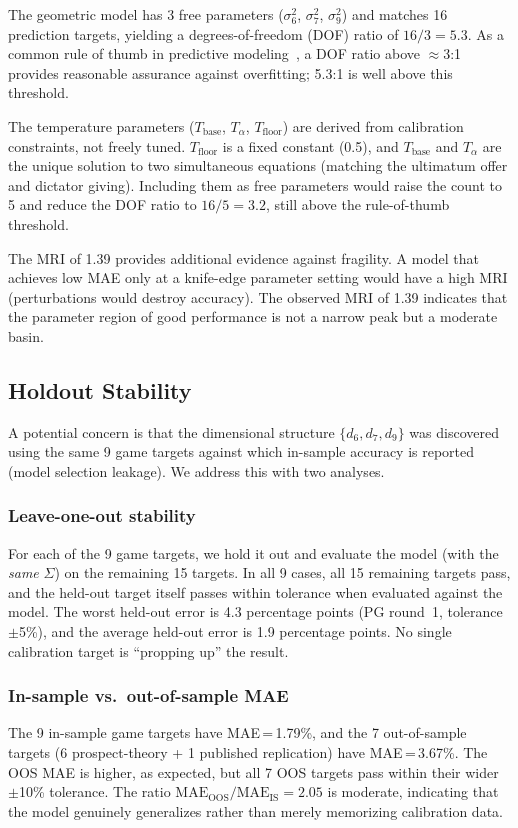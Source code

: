 \documentclass[journal]{IEEEtran}
\begin{document}
The geometric model has 3 free parameters ($\sigma_6^2$, $\sigma_7^2$, $\sigma_9^2$) and matches 16 prediction targets, yielding a degrees-of-freedom (DOF) ratio of $16/3 = 5.3$.
As a common rule of thumb in predictive modeling~\cite{hastie2009}, a DOF ratio above $\approx$3:1 provides reasonable assurance against overfitting; 5.3:1 is well above this threshold.

The temperature parameters ($T_{\text{base}}$, $T_\alpha$, $T_{\text{floor}}$) are derived from calibration constraints, not freely tuned.
$T_{\text{floor}}$ is a fixed constant (0.5), and $T_{\text{base}}$ and $T_\alpha$ are the unique solution to two simultaneous equations (matching the ultimatum offer and dictator giving).
Including them as free parameters would raise the count to 5 and reduce the DOF ratio to $16/5 = 3.2$, still above the rule-of-thumb threshold.

The MRI of 1.39 provides additional evidence against fragility.
A model that achieves low MAE only at a knife-edge parameter setting would have a high MRI (perturbations would destroy accuracy).
The observed MRI of 1.39 indicates that the parameter region of good performance is not a narrow peak but a moderate basin.

\subsection{Holdout Stability}

A potential concern is that the dimensional structure $\{d_6, d_7, d_9\}$ was discovered using the same 9 game targets against which in-sample accuracy is reported (model selection leakage).
We address this with two analyses.

\subsubsection{Leave-one-out stability}
For each of the 9 game targets, we hold it out and evaluate the model (with the \emph{same} $\Sigma$) on the remaining 15 targets.
In all 9 cases, all 15 remaining targets pass, and the held-out target itself passes within tolerance when evaluated against the model.
The worst held-out error is 4.3 percentage points (PG round~1, tolerance $\pm$5\%), and the average held-out error is 1.9 percentage points.
No single calibration target is ``propping up'' the result.

\subsubsection{In-sample vs.\ out-of-sample MAE}
The 9 in-sample game targets have MAE\,=\,1.79\%, and the 7 out-of-sample targets (6 prospect-theory + 1 published replication) have MAE\,=\,3.67\%.
The OOS MAE is higher, as expected, but all 7 OOS targets pass within their wider $\pm$10\% tolerance.
The ratio $\text{MAE}_{\text{OOS}} / \text{MAE}_{\text{IS}} = 2.05$ is moderate, indicating that the model genuinely generalizes rather than merely memorizing calibration data.
\end{document}
